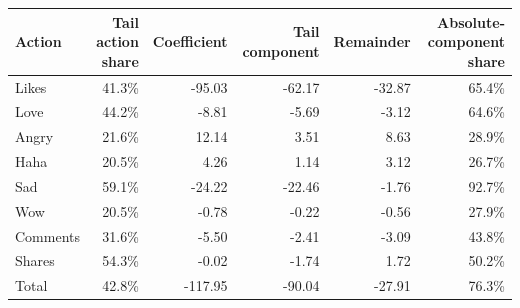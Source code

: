 \begin{tabular}{lrrrrr}
\toprule
Action & Tail action share & Coefficient & Tail component & Remainder & Absolute-component share \\
\midrule
Likes & 41.3\% & -95.03 & -62.17 & -32.87 & 65.4\% \\
Love & 44.2\% & -8.81 & -5.69 & -3.12 & 64.6\% \\
Angry & 21.6\% & 12.14 & 3.51 & 8.63 & 28.9\% \\
Haha & 20.5\% & 4.26 & 1.14 & 3.12 & 26.7\% \\
Sad & 59.1\% & -24.22 & -22.46 & -1.76 & 92.7\% \\
Wow & 20.5\% & -0.78 & -0.22 & -0.56 & 27.9\% \\
Comments & 31.6\% & -5.50 & -2.41 & -3.09 & 43.8\% \\
Shares & 54.3\% & -0.02 & -1.74 & 1.72 & 50.2\% \\
Total & 42.8\% & -117.95 & -90.04 & -27.91 & 76.3\% \\
\bottomrule
\end{tabular}

